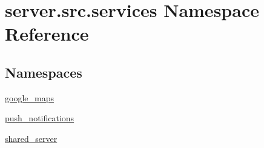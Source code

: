 \hypertarget{namespaceserver_1_1src_1_1services}{}\section{server.\+src.\+services Namespace Reference}
\label{namespaceserver_1_1src_1_1services}
\subsection*{Namespaces}
\begin{DoxyCompactItemize}
\item 
 \hyperlink{namespaceserver_1_1src_1_1services_1_1google__maps}{google\+\_\+maps}
\item 
 \hyperlink{namespaceserver_1_1src_1_1services_1_1push__notifications}{push\+\_\+notifications}
\item 
 \hyperlink{namespaceserver_1_1src_1_1services_1_1shared__server}{shared\+\_\+server}
\end{DoxyCompactItemize}
